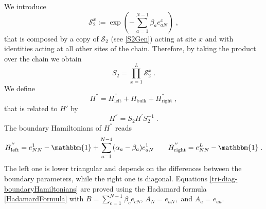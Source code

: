 \documentclass[10pt]{article}
\numberwithin{equation}{section}
\numberwithin{equation}{subsection}
\newcommand{\co}{\;,}
\newcommand{\dt}{\;.}
\begin{document}
We introduce
 \begin{equation}
 	\mathcal{S}_{2}^{x}:=\exp{\left(-\sum_{a=1}^{N-1}\beta_{a}e_{aN}^{x}\right)}\co%
 \end{equation}
that is composed by a copy of $\mathcal{S}_{2}$ (see \eqref{S2Gen}) acting at site $x$ and with identities acting at all other sites of the chain. 
Therefore, by taking the product over the chain we obtain 
\begin{equation}\label{S2-Whole}
	S_{2}=\prod_{x=1}^{L}\mathcal{S}_{2}^{x}\dt
\end{equation}
We define 
\begin{equation}\label{HSecond}
	H^{''}=H_{\text{left}}^{''}+H_{\text{bulk}}+H_{\text{right}}^{''}\co
\end{equation}
that is related to $H'$ by
\begin{equation}
	H^{''}=S_{2}H^{'}S_{2}^{-1}\dt
\end{equation}
The boundary Hamiltonians of $H^{''}$ reads
\begin{align}\label{tri-diag-boundaryHamiltonians}
	H_{\text{left}}^{''}=e_{NN}^{1}-\mathbbm{1}+\sum_{a=1}^{N-1}(\alpha_{a}-\beta_{a})e_{aN}^{1}\qquad H_{\text{right}}^{''}=e_{NN}^{L}-\mathbbm{1}\dt
\end{align}
The left one is lower triangular and depends on the differences between the boundary parameters, while the right one is diagonal. Equations \eqref{tri-diag-boundaryHamiltonians} are proved using the Hadamard formula \eqref{HadamardFormula} with $B=\sum_{c=1}^{N-1}\beta_{c}e_{cN}$, $A_{N}=e_{aN},$ and $A_{a}=e_{aa}$.
\begin{comment}
 We compute
\begin{enumerate}
	\item $A_{N}=e_{aN}$ with $a\neq 1$
	\begin{equation}
		\exp{\left(-\sum_{c=1}^{N-1}\beta_{c}e_{cN}\right)}e_{aN}\exp{\left(\sum_{c=1}^{N-1}\beta_{c}e_{cN}\right)}=e_{aN}
	\end{equation}
\item $A_{a}=e_{aa}$ with $a\neq 1$
\begin{equation}
		\exp{\left(-\sum_{c=1}^{N-1}\beta_{c}e_{cN}\right)}e_{aa}\exp{\left(\sum_{c=1}^{N}\beta_{c}e_{cN}\right)}=e_{aa}+\beta_{a}e_{aN}
	\end{equation}
Indeed 
\begin{equation}
	\sum_{c=1}^{N-1}[e_{cN},e_{aa}]=\sum_{c=1}^{N-1}\beta_{c}\left(e_{ca}\delta_{aN}-e_{aN}\delta_{ca}\right)=-\beta_{a}e_{aN}
\end{equation}
\end{enumerate}
\end{comment}
\end{document}
